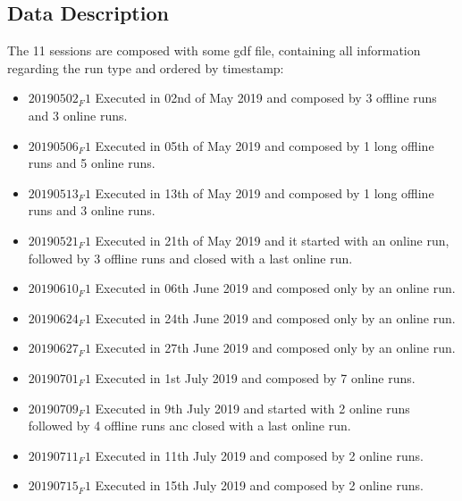 \subsection{Data Description}\label{subsec:datadesc}
The 11 sessions are composed with some gdf file, containing all information regarding the run type and ordered by timestamp:
\begin{itemize}
    \item \textbf{$20190502_F1$} Executed in 02nd of May 2019 and composed by 3 offline runs and 3 online runs.
    \item \textbf{$20190506_F1$} Executed in 05th of May 2019 and composed by 1 long offline runs and 5 online runs.
    \item \textbf{$20190513_F1$} Executed in 13th of May 2019 and composed by 1 long offline runs and 3 online runs.
    \item \textbf{$20190521_F1$} Executed in 21th of May 2019 and it started with an online run, followed by 3 offline runs and closed with a last online run.
    \item \textbf{$20190610_F1$} Executed in 06th June 2019 and composed only by an online run. 
    \item \textbf{$20190624_F1$} Executed in 24th June 2019 and composed only by an online run. 
    \item \textbf{$20190627_F1$} Executed in 27th June 2019 and composed only by an online run. 
    \item \textbf{$20190701_F1$} Executed in 1st July 2019 and composed by 7 online runs. 
    \item \textbf{$20190709_F1$} Executed in 9th July 2019 and started with 2 online runs followed by 4 offline runs anc closed with a last online run. 
    \item \textbf{$20190711_F1$} Executed in 11th July 2019 and composed by 2 online runs. 
    \item \textbf{$20190715_F1$} Executed in 15th July 2019 and composed by 2 online runs. 
\end{itemize}
\newpage
